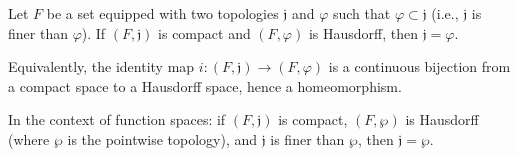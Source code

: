 Let $F$ be a set equipped with two topologies $\mathfrak{j}$ and $\varphi$ such that $\varphi \subset \mathfrak{j}$ (i.e., $\mathfrak{j}$ is finer than $\varphi$). If $(F, \mathfrak{j})$ is compact and $(F, \varphi)$ is Hausdorff, then $\mathfrak{j} = \varphi$.

Equivalently, the identity map $i : (F, \mathfrak{j}) \to (F, \varphi)$ is a continuous bijection from a compact space to a Hausdorff space, hence a homeomorphism.

In the context of function spaces: if $(F, \mathfrak{j})$ is compact, $(F, \wp)$ is Hausdorff (where $\wp$ is the pointwise topology), and $\mathfrak{j}$ is finer than $\wp$, then $\mathfrak{j} = \wp$.
